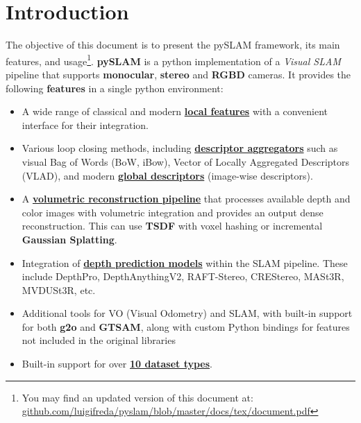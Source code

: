 \documentclass{article}
\begin{document}
\tableofcontents

\pagebreak

\section{Introduction}

The objective of this document is to present the pySLAM framework, its main features, and usage\footnote{You may find an updated version of this document at:\\ \href{https://github.com/luigifreda/pyslam/blob/master/docs/tex/document.pdf}{github.com/luigifreda/pyslam/blob/master/docs/tex/document.pdf}}. \textbf{pySLAM} is a python implementation of a \emph{Visual SLAM} pipeline that supports \textbf{monocular}, \textbf{stereo} and
\textbf{RGBD} cameras. It provides the following \textbf{features} in a single python environment: 

\begin{itemize}
    \item A wide range of classical and modern
    \textbf{\protect\hyperlink{supported-local-features}{local features}}
    with a convenient interface for their integration. 
    
    \item Various loop closing methods, including
    \textbf{\protect\hyperlink{supported-global-descriptors-and-local-descriptor-aggregation-methods}{descriptor
    aggregators}} such as visual Bag of Words (BoW, iBow), Vector of Locally
    Aggregated Descriptors (VLAD), and modern
    \textbf{\protect\hyperlink{supported-global-descriptors-and-local-descriptor-aggregation-methods}{global
    descriptors}} (image-wise descriptors).
    
    \item A
    \textbf{\protect\hyperlink{volumetric-reconstruction}{volumetric
    reconstruction pipeline}} that processes available depth and color
    images with volumetric integration and provides an output dense
    reconstruction. This can use \textbf{TSDF} with voxel hashing or
    incremental \textbf{Gaussian Splatting}.
    
    \item Integration of
    \textbf{\protect\hyperlink{depth-prediction}{depth prediction models}}
    within the SLAM pipeline. These include DepthPro, DepthAnythingV2,
    RAFT-Stereo, CREStereo, MASt3R, MVDUSt3R, etc.
    
    \item Additional tools for VO (Visual Odometry) and SLAM, with built-in
    support for both \textbf{g2o} and \textbf{GTSAM}, along with custom
    Python bindings for features not included in the original libraries

    \item Built-in support for over \textbf{\protect\hyperlink{datasets}{10 dataset
    types}}.
\end{itemize}
\end{document}
